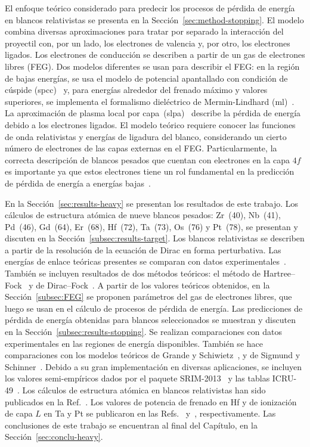 El enfoque teórico considerado para predecir los procesos de pérdida de 
energía en blancos relativistas se presenta en la 
Sección~\ref{sec:method-stopping}. El modelo combina diversas 
aproximaciones para tratar por separado la interacción del proyectil 
con, por un lado, los electrones de valencia y, por otro, los electrones 
ligados. Los electrones de conducción se describen a partir de un 
gas de electrones libres (FEG). Dos modelos diferentes se usan para 
describir el FEG: en la región de bajas energías, se usa el modelo de 
potencial apantallado con condición de cúspide 
(\acs{spcc})~\cite{Montanari:17} y, para energías alrededor del frenado 
máximo y valores superiores, se implementa el formalismo dieléctrico de 
Mermin-Lindhard (\acs{ml})~\cite{Mermin:70}. La aproximación de plasma 
local por capa~(\acs{slpa})~\cite{Montanari:13} describe la pérdida de 
energía debido a los electrones ligados. El modelo teórico requiere 
conocer las funciones de onda relativistas y energías de ligadura del 
blanco, considerando un cierto número de electrones de las capas 
externas en el FEG. Particularmente, la correcta descripción de blancos 
pesados que cuentan con electrones en la capa $4f$ es importante ya que 
estos electrones tiene un rol fundamental en la predicción de pérdida de 
energía a energías bajas~\cite{Roth:17}. 

En la Sección~\ref{sec:results-heavy} se presentan los resultados de 
este trabajo. Los cálculos de estructura atómica de nueve blancos 
pesados: Zr~(40), Nb~(41), Pd~(46), Gd~(64), Er~(68), Hf~(72), Ta~(73), 
Os~(76) y Pt~(78), se presentan y discuten en la 
Sección~\ref{subsec:results-target}. Los blancos relativistas se 
describen a partir de la resolución de la ecuación de Dirac en forma 
perturbativa. Las energías de enlace teóricas presentes se comparan con 
datos experimentales~\cite{Williams:95}. También se incluyen 
resultados de dos métodos teóricos: el método de 
Hartree--Fock~\cite{FroeseFischer:97} y de 
Dirac--Fock~\cite{Desclaux:73}. 
A partir de los valores teóricos obtenidos, en la 
Sección~\ref{subsec:FEG} se proponen parámetros del gas de 
electrones libres, que luego se usan en el cálculo de procesos de pérdida 
de energía. Las predicciones de pérdida de energía 
obtenidas para blancos seleccionados se muestran y discuten en la 
Sección~\ref{subsec:results-stopping}. Se realizan comparaciones con 
datos experimentales en las regiones de energía disponibles. También se 
hace comparaciones con los modelos teóricos de Grande y 
Schiwietz~\cite{Grande:01,casp52}, y de Sigmund y 
Schinner~\cite{DPASS20}. Debido a su gran implementación en diversas 
aplicaciones, se incluyen los valores semi-empíricos dados por el 
paquete SRIM-2013~\cite{Ziegler01} y las tablas ICRU-49~\cite{ICRU49}. 
Los cálculos de estructura atómica en blancos relativistas han sido 
publicados en la Ref.~\cite{Mendez:19relat}. Los valores de potencia de
frenado en Hf y de ionización de capa $L$ en Ta y Pt se publicaron en 
las Refs.~\cite{Montanari:20} y~\cite{Oswald:20}, respectivamente. Las 
conclusiones de este trabajo se encuentran al final del Capítulo, en 
la Sección~\ref{sec:conclu-heavy}.

